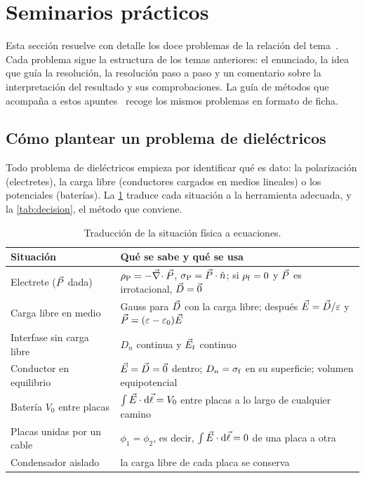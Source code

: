 \section{Seminarios prácticos}\label{sec:seminarios}

Esta sección resuelve con detalle los doce problemas de la relación del tema~\cite{DFA-problemas}. Cada
problema sigue la estructura de los temas anteriores: el enunciado, la idea que guía la resolución, la
resolución paso a paso y un comentario sobre la interpretación del resultado y sus comprobaciones. La guía
de métodos que acompaña a estos apuntes~\cite{Guia-T4} recoge los mismos problemas en formato de ficha.

\subsection{Cómo plantear un problema de dieléctricos}\label{sec:plantear}

Todo problema de dieléctricos empieza por identificar qué es dato: la polarización (electretes), la carga
libre (conductores cargados en medios lineales) o los potenciales (baterías). La \cref{tab:traduccion}
traduce cada situación a la herramienta adecuada, y la \cref{tab:decision}, el método que conviene.

\begin{table}[H]
\centering
\caption{Traducción de la situación física a ecuaciones.}\label{tab:traduccion}
\small
\begin{tabularx}{\textwidth}{@{}>{\raggedright\arraybackslash}p{4.3cm}>{\raggedright\arraybackslash}X@{}}
\toprule
Situación & Qué se sabe y qué se usa\\
\midrule
Electrete ($\vec P$ dada) & $\rho_{\mathrm P}=-\vec\nabla\!\cdot\vec P$, $\sigma_{\mathrm P}=\vec P\cdot\hat n$; si $\rho_{\mathrm f}=0$ y $\vec P$ es irrotacional, $\vec D=\vec 0$\\
Carga libre en medio \LHI{} & Gauss para $\vec D$ con la carga libre; después $\vec E=\vec D/\varepsilon$ y $\vec P=(\varepsilon-\varepsilon_0)\vec E$\\
Interfase sin carga libre & $D_n$ continua y $\vec E_t$ continuo\\
Conductor en equilibrio & $\vec E=\vec D=\vec 0$ dentro; $D_n=\sigma_{\mathrm f}$ en su superficie; volumen equipotencial\\
Batería $V_0$ entre placas & $\int\vec E\cdot\mathop{}\!\mathrm{d}\vec\ell=V_0$ entre placas a lo largo de cualquier camino\\
Placas unidas por un cable & $\phi_1=\phi_2$, es decir, $\int\vec E\cdot\mathop{}\!\mathrm{d}\vec\ell=0$ de una placa a otra\\
Condensador aislado & la carga libre de cada placa se conserva\\
\bottomrule
\end{tabularx}
\end{table}

